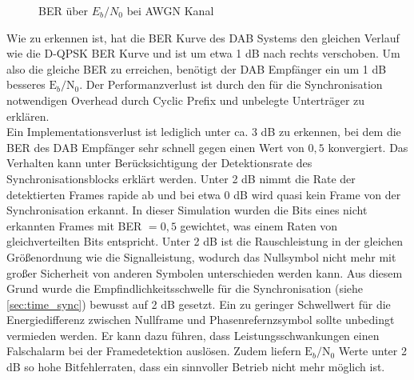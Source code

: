\begin{figure}[htb]
\begin{center}
\end{center}
\caption{BER über $E_b/N_0$ bei AWGN Kanal}
\label{plot:awgn_ber}
\end{figure}

Wie zu erkennen ist, hat die BER Kurve des DAB Systems den gleichen Verlauf wie die D-QPSK BER Kurve und ist um etwa 1 dB nach rechts verschoben. Um also die gleiche BER zu erreichen, benötigt der DAB Empfänger ein um 1 dB besseres $\text{E}_b/\text{N}_0$. Der Performanzverlust ist durch den für die Synchronisation notwendigen Overhead durch Cyclic Prefix und unbelegte Unterträger zu erklären.\\
Ein Implementationsverlust ist lediglich unter ca. 3 dB zu erkennen, bei dem die BER des DAB Empfänger sehr schnell gegen einen Wert von $0,5$ konvergiert. Das Verhalten kann unter Berücksichtigung der Detektionsrate des Synchronisationsblocks erklärt werden. Unter 2 dB nimmt die Rate der detektierten Frames rapide ab und bei etwa 0 dB wird quasi kein Frame von der Synchronisation erkannt. In dieser Simulation wurden die Bits eines nicht erkannten Frames mit BER $= 0,5$ gewichtet, was einem Raten von gleichverteilten Bits entspricht. Unter 2 dB ist die Rauschleistung in der gleichen Größenordnung wie die Signalleistung, wodurch das Nullsymbol nicht mehr mit großer Sicherheit von anderen Symbolen unterschieden werden kann. Aus diesem Grund wurde die Empfindlichkeitsschwelle für die Synchronisation (siehe \ref{sec:time_sync}) bewusst auf 2 dB gesetzt. Ein zu geringer Schwellwert für die Energiedifferenz zwischen Nullframe und Phasenrefernzsymbol sollte unbedingt vermieden werden. Er kann dazu führen, dass Leistungsschwankungen einen Falschalarm bei der Framedetektion auslösen. Zudem liefern $\text{E}_b/\text{N}_0$ Werte unter 2 dB so hohe Bitfehlerraten, dass ein sinnvoller Betrieb nicht mehr möglich ist.

